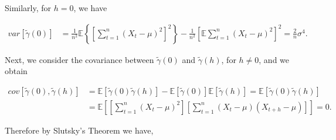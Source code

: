 \documentclass[]{book}
\theoremstyle{definition}
\theoremstyle{definition}
\theoremstyle{definition}
\theoremstyle{remark}
\begin{document}
Similarly, for \(h = 0\), we have

\[
\begin{aligned}
        var[\tilde{\gamma} \left( 0 \right)] &= \frac{1}{n^2}\mathbb{E}\left\{\left[\sum\limits_{t = 1}^{n} {\left( {{X_t} - \mu} \right)^2}\right]^2\right\} - \frac{1}{n^2}\left[\mathbb{E}\sum\limits_{t = 1}^{n} {\left( {{X_t} - \mu} \right)^2}\right]^2
        = \frac{2}{n}\sigma^4.
    \end{aligned}
\]

Next, we consider the covariance between
\(\tilde{\gamma} \left( 0 \right)\) and
\(\tilde{\gamma} \left( h \right)\), for \(h \neq 0\), and we obtain

\[
\begin{aligned}
        cov[\tilde{\gamma} \left( 0 \right), \tilde{\gamma} \left( h \right)] &= \mathbb{E}[\tilde{\gamma} \left( 0 \right) \tilde{\gamma} \left( h \right)] - \mathbb{E}[\tilde{\gamma} \left( 0 \right)] \mathbb{E}[\tilde{\gamma} \left( h \right)]
        = \mathbb{E}[\tilde{\gamma} \left( 0 \right) \tilde{\gamma} \left( h \right)]\\
        &= \mathbb{E}\left[\left[\sum\limits_{t = 1}^{n} {\left( {{X_t} - \mu} \right)^2}\right]\left[\sum\limits_{t = 1}^{n} {\left( {{X_t} - \mu} \right)\left( {{X_{t + h}} - \mu} \right)}\right]\right]
        = 0.
    \end{aligned}
\]

Therefore by Slutsky's Theorem we have,
\end{document}
